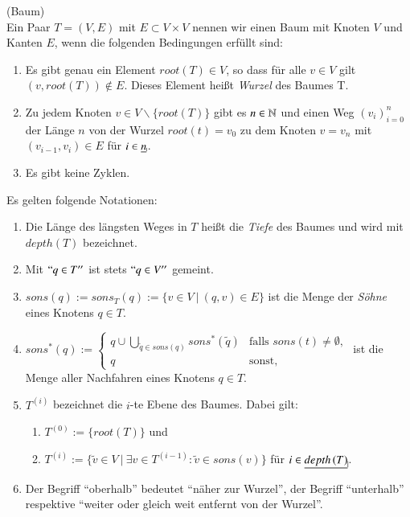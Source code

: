       \begin{defn}
      \label{def:tree}
	(Baum)\\
	Ein Paar $T = \left(V,E\right)$ mit $E \subset V \times V$ nennen wir einen Baum mit Knoten $V$ und Kanten $E$, wenn die folgenden Bedingungen erfüllt sind:
	\begin{enumerate}
	  \item Es gibt genau ein Element $root\left(T\right) \in V$, so dass für alle $v \in V$ gilt $\left(v, root\left(T\right)\right) \notin E$. Dieses Element heißt \textit{Wurzel} des Baumes T.
	  \item Zu jedem Knoten $v \in V \backslash \{root\left(T\right)\}$ gibt es $n \in \mathbb{N}$ und einen Weg $\left(v_i\right)_{i = 0}^n$ der Länge $n$ von der Wurzel $root\left(t\right) = v_0$ zu dem Knoten
		$v = v_n$ mit $\left(v_{i-1}, v_{i}\right) \in E$ für $i \in \haken{n}$.
	  \item Es gibt keine Zyklen.
	\end{enumerate}
	Es gelten folgende Notationen:
	\begin{enumerate}
	  \item Die Länge des längsten Weges in $T$ heißt die \textit{Tiefe} des Baumes und wird mit $depth\left(T\right)$ bezeichnet.
	  \item Mit $``q \in T''$ ist stets $``q \in V''$ gemeint.
	  \item $sons\left(q\right) := sons_T\left(q\right) := \{v \in V \ | \ \left(q,v\right) \in E\}$ ist die Menge der \textit{Söhne} eines Knotens $q \in T$.
	  \item $sons^*\left(q\right) := 
	    \begin{cases}
	      {q} \cup \bigcup_{\tilde q \in sons(q)} sons^*\left( \tilde q \right) & \text{falls } sons(t) \neq \emptyset,\\
	      {q} 								   & \text{sonst,}
	    \end{cases}$
	    ist die Menge aller Nachfahren eines Knotens $q \in T$.
	  \item $T^{\left(i\right)}$ bezeichnet die $i$-te Ebene des Baumes. Dabei gilt:
	    \begin{enumerate}
	      \item $T^{\left(0\right)} := \{root\left(T\right)\}$ und
	      \item $T^{\left(i\right)} := \{\tilde v \in V \ | \ \exists v \in T^{\left(i-1\right)} \colon \tilde v \in sons\left(v\right)\}$ für $i \in \haken{depth\left(T\right)}$.
	    \end{enumerate}
	  \item Der Begriff ``oberhalb'' bedeutet ``näher zur Wurzel'', der Begriff ``unterhalb'' respektive ``weiter oder gleich weit entfernt von der Wurzel''.

\end{enumerate}
\end{defn}

